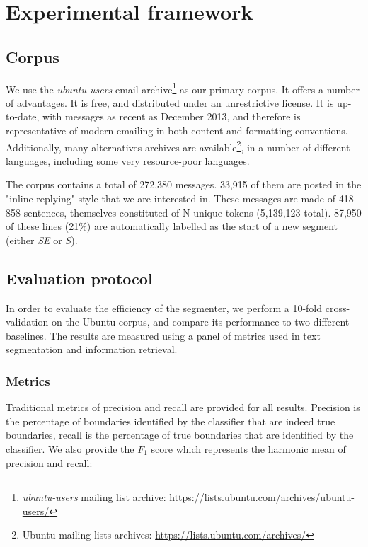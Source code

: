
\section{Experimental framework}

\subsection{Corpus}

We use the \textit{ubuntu-users} email archive\footnote{\textit{ubuntu-users} mailing list archive: \url{https://lists.ubuntu.com/archives/ubuntu-users/}} as our primary corpus. It offers a number of advantages. It is free, and distributed under an unrestrictive license. It is up-to-date, with messages as recent as December 2013, and therefore is representative of modern emailing in both content and formatting conventions. Additionally, many alternatives archives are available\footnote{Ubuntu mailing lists archives: \url{https://lists.ubuntu.com/archives/}}, in a number of different languages, including some very resource-poor languages.

The corpus contains a total of 272,380 messages. 33,915 of them are posted in the "inline-replying" style that we are interested in. These messages are made of 418 858 sentences, themselves constituted of N unique tokens (5,139,123 total). 87,950 of these lines (21\%) are automatically labelled as the start of a new segment (either \textit{SE} or \textit{S}).

\subsection{Evaluation protocol}

In order to evaluate the efficiency of the segmenter, we perform a 10-fold cross-validation on the Ubuntu corpus, and compare its performance to two different baselines. The results are measured using a panel of metrics used in text segmentation and information retrieval.

\subsubsection{Metrics}

Traditional metrics of precision and recall are provided for all results. Precision is the percentage of boundaries identified by the classifier that are indeed true boundaries, recall is the percentage of true boundaries that are identified by the classifier. We also provide the $F_1$ score which represents the harmonic mean of precision and recall:

